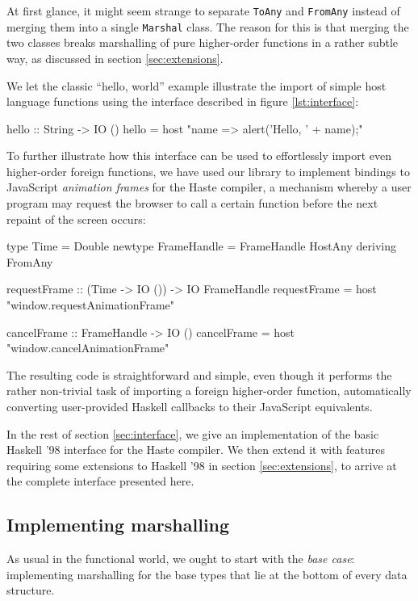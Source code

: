 \documentclass[preprint]{sigplanconf}
\begin{document}
At first glance, it might seem strange to separate \lstinline!ToAny!
and \lstinline!FromAny! instead of merging them into a single
\lstinline!Marshal! class. The reason for this is that merging the two classes
breaks marshalling of pure higher-order functions in a rather subtle way, as
discussed in section \ref{sec:extensions}.

We let the classic ``hello, world'' example illustrate the import of simple
host language functions using the interface described in figure
\ref{lst:interface}:

\begin{code}
hello :: String -> IO ()
hello = host "name => alert('Hello, ' + name);"
\end{code}

To further illustrate how this interface can be used to effortlessly import
even higher-order foreign functions, we have used our library to
implement bindings to JavaScript \emph{animation frames} for the Haste
compiler, a mechanism whereby a user program may request the browser to call
a certain function before the next repaint of the screen occurs:

\begin{code}
type Time = Double
newtype FrameHandle = FrameHandle HostAny
  deriving FromAny

requestFrame :: (Time -> IO ()) -> IO FrameHandle
requestFrame = host "window.requestAnimationFrame"

cancelFrame :: FrameHandle -> IO ()
cancelFrame = host "window.cancelAnimationFrame"
\end{code}

The resulting code is straightforward and simple, even though it performs
the rather non-trivial task of importing a foreign higher-order function,
automatically converting user-provided Haskell callbacks to their JavaScript
equivalents.

In the rest of section \ref{sec:interface}, we give an implementation of the
basic Haskell '98 interface for the Haste compiler.
We then extend it with features requiring some extensions to Haskell '98
in section \ref{sec:extensions}, to arrive at the complete interface
presented here.

\subsection{Implementing marshalling}\label{sec:marshalling}
As usual in the functional world, we ought to start with the \emph{base case}:
implementing marshalling for the base types that lie at the bottom of every
data structure.
\end{document}
